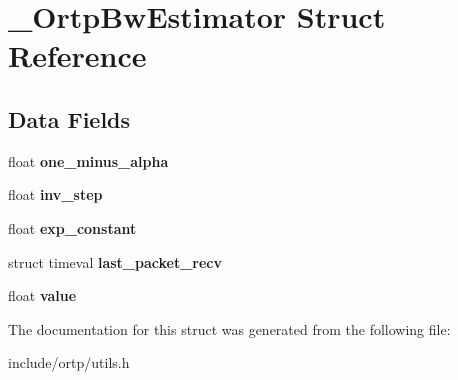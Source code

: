 \section{\+\_\+\+Ortp\+Bw\+Estimator Struct Reference}
\label{struct__OrtpBwEstimator}
\subsection*{Data Fields}
\begin{DoxyCompactItemize}
\item 
\mbox{\label{struct__OrtpBwEstimator_a8eb1a2befdc7f1213a65c04f963a5cad}} 
float {\bfseries one\+\_\+minus\+\_\+alpha}
\item 
\mbox{\label{struct__OrtpBwEstimator_af6fafbf33e5019d1ec3b5c3ed7a1191c}} 
float {\bfseries inv\+\_\+step}
\item 
\mbox{\label{struct__OrtpBwEstimator_a46bcdd9c1ee01e9de83278024dfb8404}} 
float {\bfseries exp\+\_\+constant}
\item 
\mbox{\label{struct__OrtpBwEstimator_a77643ba7fdd46c8268bb24c842974578}} 
struct timeval {\bfseries last\+\_\+packet\+\_\+recv}
\item 
\mbox{\label{struct__OrtpBwEstimator_a28e58e540f27e67a0c346536b289ec1a}} 
float {\bfseries value}
\end{DoxyCompactItemize}


The documentation for this struct was generated from the following file\+:\begin{DoxyCompactItemize}
\item 
include/ortp/utils.\+h\end{DoxyCompactItemize}

